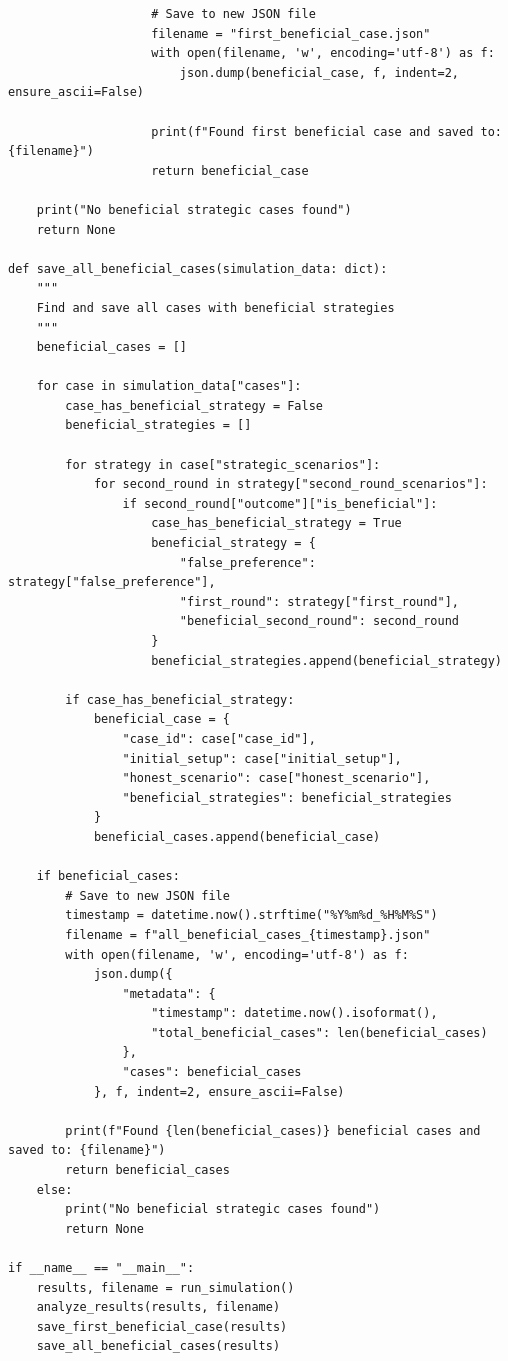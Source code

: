 \documentclass{article}
\begin{document}
\begin{verbatim}
                    # Save to new JSON file
                    filename = "first_beneficial_case.json"
                    with open(filename, 'w', encoding='utf-8') as f:
                        json.dump(beneficial_case, f, indent=2, ensure_ascii=False)
                    
                    print(f"Found first beneficial case and saved to: {filename}")
                    return beneficial_case
    
    print("No beneficial strategic cases found")
    return None

def save_all_beneficial_cases(simulation_data: dict):
    """
    Find and save all cases with beneficial strategies
    """
    beneficial_cases = []
    
    for case in simulation_data["cases"]:
        case_has_beneficial_strategy = False
        beneficial_strategies = []
        
        for strategy in case["strategic_scenarios"]:
            for second_round in strategy["second_round_scenarios"]:
                if second_round["outcome"]["is_beneficial"]:
                    case_has_beneficial_strategy = True
                    beneficial_strategy = {
                        "false_preference": strategy["false_preference"],
                        "first_round": strategy["first_round"],
                        "beneficial_second_round": second_round
                    }
                    beneficial_strategies.append(beneficial_strategy)
        
        if case_has_beneficial_strategy:
            beneficial_case = {
                "case_id": case["case_id"],
                "initial_setup": case["initial_setup"],
                "honest_scenario": case["honest_scenario"],
                "beneficial_strategies": beneficial_strategies
            }
            beneficial_cases.append(beneficial_case)
    
    if beneficial_cases:
        # Save to new JSON file
        timestamp = datetime.now().strftime("%Y%m%d_%H%M%S")
        filename = f"all_beneficial_cases_{timestamp}.json"
        with open(filename, 'w', encoding='utf-8') as f:
            json.dump({
                "metadata": {
                    "timestamp": datetime.now().isoformat(),
                    "total_beneficial_cases": len(beneficial_cases)
                },
                "cases": beneficial_cases
            }, f, indent=2, ensure_ascii=False)
        
        print(f"Found {len(beneficial_cases)} beneficial cases and saved to: {filename}")
        return beneficial_cases
    else:
        print("No beneficial strategic cases found")
        return None

if __name__ == "__main__":
    results, filename = run_simulation()
    analyze_results(results, filename)
    save_first_beneficial_case(results)
    save_all_beneficial_cases(results)
\end{verbatim}
\end{document}
